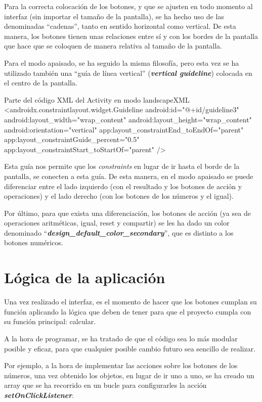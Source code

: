 \documentclass{\ClassPath/viu-tfm-template}
\begin{document}
Para la correcta colocación de los botones, y que se ajusten en todo momento al interfaz (sin importar el tamaño de la pantalla), se ha hecho uso de las denominadas “cadenas”, tanto en sentido horizontal como vertical. De esta manera, los botones tienen unas relaciones entre sí y con los bordes de la pantalla que hace que se coloquen de manera relativa al tamaño de la pantalla.

Para el modo apaisado, se ha seguido la misma filosofía, pero esta vez se ha utilizado también una “guía de línea vertical” (\textbf{\textit{vertical guideline}}) colocada en el centro de la pantalla.


\begin{mycode}{Parte del código XML del Activity en modo landscape}{XML}{}
<androidx.constraintlayout.widget.Guideline
    android:id="@+id/guideline3"
    android:layout_width="wrap_content"
    android:layout_height="wrap_content"
    android:orientation="vertical"
    app:layout_constraintEnd_toEndOf="parent"
    app:layout_constraintGuide_percent="0.5"
    app:layout_constraintStart_toStartOf="parent" />
\end{mycode}

Esta guía nos permite que los \textit{constraints} en lugar de ir hasta el borde de la pantalla, se conecten a esta guía. De esta manera, en el modo apaisado se puede diferenciar entre el lado izquierdo (con el resultado y los botones de acción y operaciones) y el lado derecho (con los botones de los números y el igual).

Por último, para que exista una diferenciación, los botones de acción (ya sea de operaciones aritméticas, igual, reset y compartir) se les ha dado un color denominado “\textbf{\textit{design\_default\_color\_secondary}}”, que es distinto a los botones numéricos.


\section{Lógica de la aplicación}
Una vez realizado el interfaz, es el momento de hacer que los botones cumplan su función aplicando la lógica que deben de tener para que el proyecto cumpla con su función principal: calcular.

A la hora de programar, se ha tratado de que el código sea lo más modular posible y eficaz, para que cualquier posible cambio futuro sea sencillo de realizar.

Por ejemplo, a la hora de implementar las acciones sobre los botones de los números, una vez obtenido los objetos, en lugar de ir uno a uno, se ha creado un array que se ha recorrido en un bucle para configurarles la acción \textbf{\textit{setOnClickListener}}.
\end{document}
